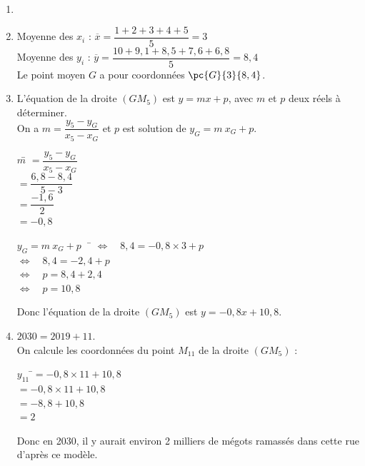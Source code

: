 \documentclass[a4paper,11pt,exos]{nsi} %
\begin{document}
\textcolor{UGLiBlue}{
    \begin{enumerate}
        \item 
            \def\xmin{-1} \def\ymin{-1}\def\xmax{12}\def\ymax{12}
        \item Moyenne des $x_i$ : $\overline{x}=\dfrac{1+2+3+4+5}{5}=3$\\
        Moyenne des $y_i$ : $\overline{y}=\dfrac{10+9,1+8,5+7,6+6,8}{5}=8,4$\\
        Le point moyen $G$ a pour coordonnées $\pc{G}{3}{8,4}$.
        \item L'équation de la droite $(GM_5)$ est $y=mx+p$, avec $m$ et $p$ deux réels à déterminer.\\
        On a $m=\dfrac{y_5-y_G}{x_5-x_G}$ et $p$ est solution de $y_G=m\ x_G+p$.
        \begin{multicols}{2}
            \begin{tabbing}
                $m$\= $=\dfrac{y_5-y_G}{x_5-x_G}$\\
                \> $=\dfrac{6,8-8,4}{5-3}$\\
                \> $=\dfrac{-1,6}{2}$\\
                \> $=-0,8$
            \end{tabbing}
            \begin{tabbing}
                $y_G=m\ x_G+p\quad$\= $\iff \quad 8,4=-0,8\times 3+p$\\
                \> $\iff \quad 8,4=-2,4+p$\\
                \> $\iff \quad p=8,4+2,4$\\
                \> $\iff \quad p=10,8$
            \end{tabbing}
        \end{multicols}
        Donc l'équation de la droite $(GM_5)$ est $y=-0,8x+10,8$.
        \item $2030=2019+11$.\\
        On calcule les coordonnées du point $M_{11}$ de la droite $(GM_5)$ :
        \begin{tabbing}
            $y_{11}$    \=$=-0,8\times 11+10,8$\\
            \> $=-0,8\times 11+10,8$\\
            \> $=-8,8+10,8$\\
            \> $=2$
        \end{tabbing}
        Donc en 2030, il y aurait environ 2 milliers de mégots ramassés dans cette rue d'après ce modèle.
    \end{enumerate}
}
\end{document}
